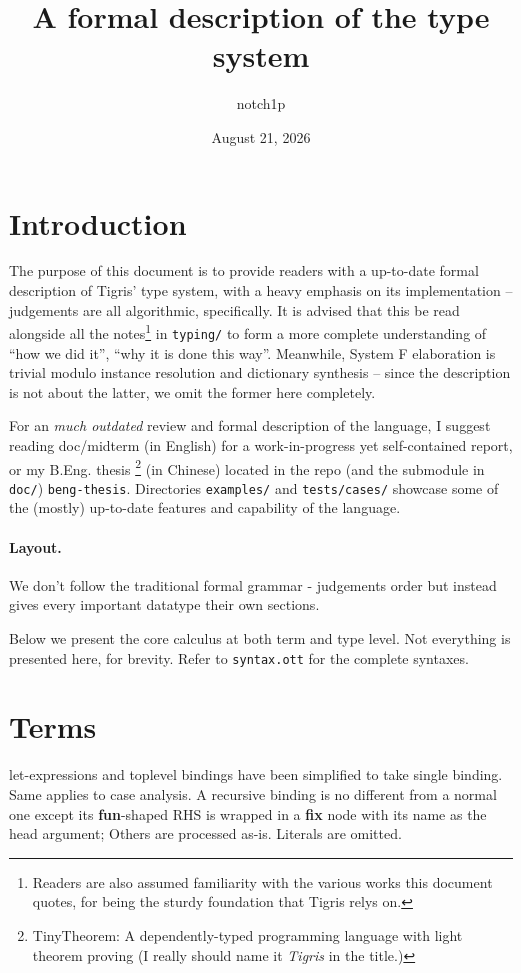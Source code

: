 \documentclass[a4paper, 11pt]{article}
\title{A formal description of the type system}
\author{notch1p}
\date{August 21, 2026}
\theoremstyle{remark}
\begin{document}
\maketitle
\section{Introduction}

The purpose of this document is to provide readers with a up-to-date formal
description of Tigris' type system, with a heavy emphasis on its implementation
-- judgements are all algorithmic, specifically.
It is advised that this be read alongside all the notes\footnote{
  Readers are also assumed familiarity with the various works this document quotes, for
  being the sturdy foundation that Tigris relys on.
}
in
\texttt{typing/} to form a more complete understanding of ``how we did it'',
``why it is done this way''. Meanwhile, System F elaboration is trivial modulo instance
resolution and dictionary synthesis -- since the description is not about the latter, we omit the former
here completely.

For an \emph{much outdated} review and formal description of the language,
I suggest reading doc/midterm (in English) for a work-in-progress yet self-contained report,
or my B.Eng. thesis%
\footnote{TinyTheorem: A dependently-typed programming language with light theorem proving (I really should name it \emph{Tigris} in the title.)}
(in Chinese) located in the repo (and the submodule in \texttt{doc/}) \texttt{beng-thesis}.
Directories \texttt{examples/} and \texttt{tests/cases/} showcase some of the
(mostly) up-to-date features and capability of the language.

\paragraph{Layout.} We don't follow the traditional formal grammar - judgements order but
instead gives every important datatype their own sections.

Below we present the core calculus at both term and type level. Not everything is presented here,
for brevity. Refer to \texttt{syntax.ott} for the complete syntaxes.

\section{Terms}

let-expressions and toplevel bindings have been simplified to take single binding. Same
applies to case analysis. A recursive binding is no different from a normal one except
its \textbf{fun}-shaped RHS is wrapped in a \textbf{fix} node with its name as the head argument; Others are processed as-is.
Literals are omitted.
\end{document}
